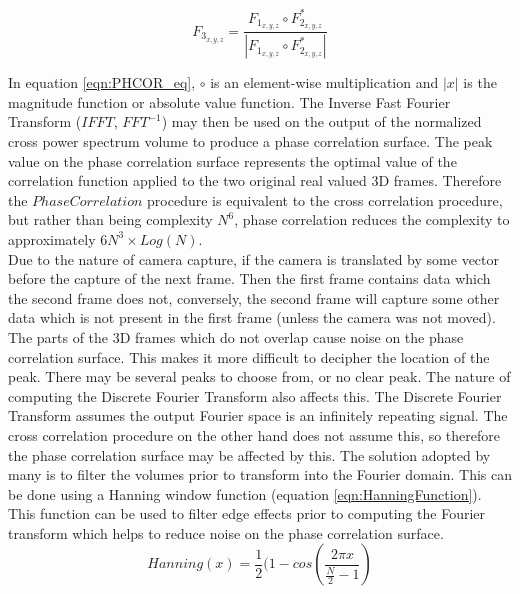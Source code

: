\begin{equation} \label{eqn:PHCOR_eq}
F_{3_{x,y,z}} = \frac{F_{1_{x,y,z}} \circ F_{2_{x,y,z}}^*}{ | F_{1_{x,y,z}} \circ F_{2_{x,y,z}}^* | }
\end{equation}

In equation \ref{eqn:PHCOR_eq}, $\circ$ is an element-wise multiplication and $|x|$ is the magnitude function or absolute value function. The Inverse Fast Fourier Transform ($IFFT$, $FFT^{-1}$) may then be used on the output of the normalized cross power spectrum volume to produce a phase correlation surface. The peak value on the phase correlation surface represents the optimal value of the correlation function applied to the two original real valued 3D frames. Therefore the $PhaseCorrelation$ procedure is equivalent to the cross correlation procedure, but rather than being complexity $N^6$, phase correlation reduces the complexity to approximately $6N^3 \times Log(N)$. \\


Due to the nature of camera capture, if the camera is translated by some vector before the capture of the next frame. Then the first frame contains data which the second frame does not, conversely, the second frame will capture some other data which is not present in the first frame (unless the camera was not moved). The parts of the 3D frames which do not overlap cause noise on the phase correlation surface. This makes it more difficult to decipher the location of the peak. There may be several peaks to choose from, or no clear peak. The nature of computing the Discrete Fourier Transform also affects this. The Discrete Fourier Transform assumes the output Fourier space is an infinitely repeating signal. The cross correlation procedure on the other hand does not assume this, so therefore the phase correlation surface may be affected by this. The solution adopted by many is to filter the volumes prior to transform into the Fourier domain. This can be done using a Hanning window function (equation \ref{eqn:HanningFunction}). This function can be used to filter edge effects prior to computing the Fourier transform which helps to reduce noise on the phase correlation surface. \\

\begin{equation} \label{eqn:HanningFunction}
Hanning(x) = \frac{1}{2}(1 - cos\left(\frac{2\pi x}{\frac{N}{2} - 1}\right)
\end{equation}

